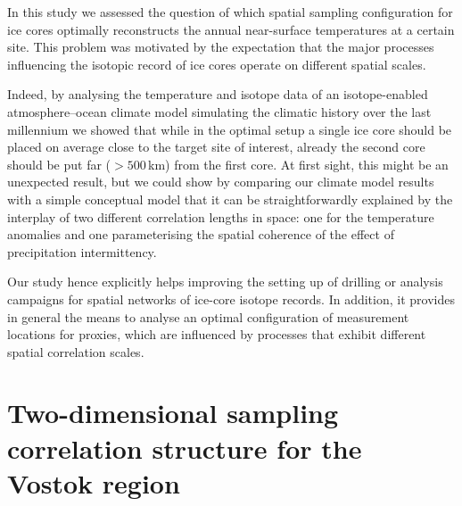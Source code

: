 \documentclass[cp, manuscript]{copernicus}
\begin{document}



\conclusions

In this study we assessed the question of which spatial sampling configuration
for ice cores optimally reconstructs the annual near-surface temperatures at a
certain site. This problem was motivated by the expectation that the major
processes influencing the isotopic record of ice cores operate on different
spatial scales.

Indeed, by analysing the temperature and isotope data of an isotope-enabled
atmosphere--ocean climate model simulating the climatic history over the last
millennium we showed that while in the optimal setup a single ice core should be
placed on average close to the target site of interest, already the second core
should be put far ($>500$\,km) from the first core. At first sight, this might
be an unexpected result, but we could show by comparing our climate model
results with a simple conceptual model that it can be straightforwardly
explained by the interplay of two different correlation lengths in space: one
for the temperature anomalies and one parameterising the spatial coherence of
the effect of precipitation intermittency.

Our study hence explicitly helps improving the setting up of drilling or
analysis campaigns for spatial networks of ice-core isotope records. In
addition, it provides in general the means to analyse an optimal configuration
of measurement locations for proxies, which are influenced by processes that
exhibit different spatial correlation scales.

\appendix

\section{Two-dimensional sampling correlation structure for the Vostok region}
\label{app:vostok.n2}
\end{document}
